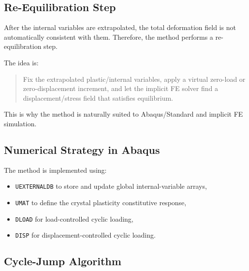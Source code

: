 \documentclass[11pt,a4paper]{article}
\begin{document}
\subsection{Re-Equilibration Step}

After the internal variables are extrapolated, the total deformation field is not automatically consistent with them. Therefore, the method performs a re-equilibration step.

The idea is:

\begin{quote}
Fix the extrapolated plastic/internal variables, apply a virtual zero-load or zero-displacement increment, and let the implicit FE solver find a displacement/stress field that satisfies equilibrium.
\end{quote}

This is why the method is naturally suited to Abaqus/Standard and implicit FE simulation.

\subsection{Numerical Strategy in Abaqus}

The method is implemented using:

\begin{itemize}
    \item \texttt{UEXTERNALDB} to store and update global internal-variable arrays,
    \item \texttt{UMAT} to define the crystal plasticity constitutive response,
    \item \texttt{DLOAD} for load-controlled cyclic loading,
    \item \texttt{DISP} for displacement-controlled cyclic loading.
\end{itemize}

\subsection{Cycle-Jump Algorithm}
\end{document}
